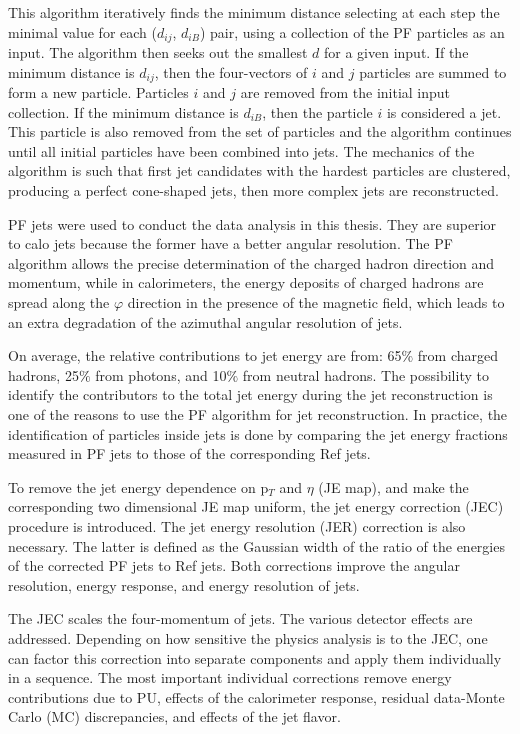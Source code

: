 This algorithm iteratively finds the minimum distance selecting at each step the minimal value for each ($d_{ij}$, $d_{iB}$) pair, using a collection of the PF particles as an input. The algorithm then seeks out the smallest $d$ for a given input. If the minimum distance is $d_{ij}$, then the four-vectors of $i$ and $j$ particles are summed to form a new particle. Particles $i$ and $j$ are removed from the initial input collection. If the minimum distance is $d_{iB}$, then the particle $i$ is considered a jet. This particle is also removed from the set of particles and the algorithm continues until all initial particles have been combined into jets. The mechanics of the algorithm is such that first jet candidates with the hardest particles are clustered, producing a perfect cone-shaped jets, then more complex jets are reconstructed.

PF jets were used to conduct the data analysis in this thesis. They are superior to calo jets because the former have a better angular resolution. The PF algorithm allows the precise determination of the charged hadron direction and momentum, while in calorimeters, the energy deposits of charged hadrons are spread along the $\varphi$ direction in the presence of the magnetic field, which leads to an extra degradation of the azimuthal angular resolution of jets.

On average, the relative contributions to jet energy are from: 65$\%$ from charged hadrons, 25$\%$ from photons, and 10$\%$ from neutral hadrons. The possibility to identify the contributors to the total jet energy during the jet reconstruction is one of the reasons to use the PF algorithm for jet reconstruction. In practice, the identification of particles inside jets is done by comparing the jet energy fractions measured in PF jets to those of the corresponding Ref jets.

To remove the jet energy dependence on p$_T$ and $\eta$ (JE map), and make the corresponding two dimensional JE map uniform, the jet energy correction (JEC) procedure is introduced. The jet energy resolution (JER) correction is also necessary. The latter is defined as the Gaussian width of the ratio of the energies of the corrected PF jets to Ref jets. Both corrections improve the angular resolution, energy response, and energy resolution of jets. 

The JEC scales the four-momentum of jets. The various detector effects are addressed. Depending on how sensitive the physics analysis is to the JEC, one can factor this correction into separate components and apply them individually in a sequence. The most important individual corrections remove energy contributions due to PU, effects of the calorimeter response, residual data-Monte Carlo (MC) discrepancies, and effects of the jet flavor.


